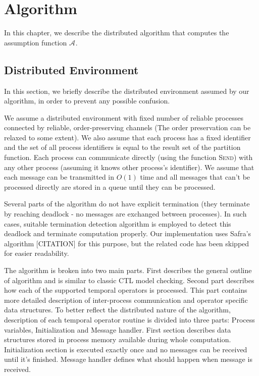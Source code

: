 \documentclass[12pt,oneside, draft]{fithesis2}
\newcommand{\as}[1][]{\ensuremath{\mathcal{A}_{#1}}}
\newcommand{\method}[1]{\textnormal{\textsc{#1}}}
\begin{document}
		
    \chapter{Algorithm}
    
    	In this chapter, we describe the distributed algorithm that computes the assumption function $\as$. 
    	
    	\section{Distributed Environment}
    	
		In this section, we briefly describe the distributed environment assumed by our algorithm, in order to prevent any possible confusion.
		
		We assume a distributed environment with fixed number of reliable processes connected by reliable, order-preserving channels (The order preservation can be relaxed to some extent). We also assume that each process has a fixed identifier and the set of all process identifiers is equal to the result set of the partition function. Each process can communicate directly (using the function \method{Send}) with any other process (assuming it knows other process's identifier). We assume that each message can be transmitted in $O(1)$ time and all messages that can't be processed directly are stored in a queue until they can be processed.		
		
		Several parts of the algorithm do not have explicit termination (they terminate by reaching deadlock - no messages are exchanged between processes). In such cases, suitable termination detection algorithm is employed to detect this deadlock and terminate computation properly. Our implementation uses Safra's algorithm [CITATION] for this purpose, but the related code has been skipped for easier readability.
    	
		The algorithm is broken into two main parts. First describes the general outline of algorithm and is similar to classic CTL model checking. Second part describes how each of the supported temporal operators is processed. This part contains more detailed description of inter-process communication and operator specific data structures. To better reflect the distributed nature of the algorithm, description of each temporal operator routine is divided into three parts: Process variables, Initialization and Message handler. First section describes data structures stored in process memory available during whole computation. Initialization section is executed exactly once and no messages can be received until it's finished. Message handler defines what should happen when message is received.  
		
\end{document}
